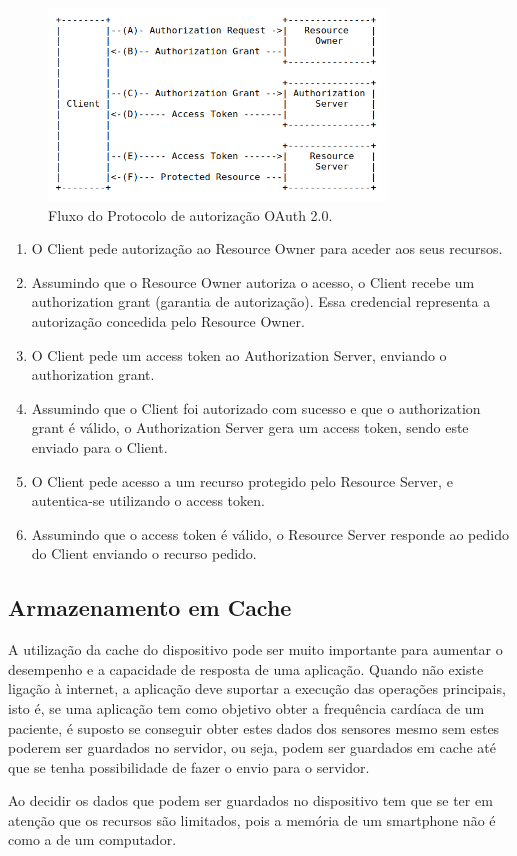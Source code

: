 \documentclass[11pt,twoside,a4paper]{report}
\begin{document}
\begin{figure}[H]
  \centering
  \includegraphics[width=0.8\textwidth]{imgs/oauth2flow.png}
  \caption[Fluxo do Protocolo 2.0]{Fluxo do Protocolo de autorização OAuth 2.0. \cite{oauth20}}
  \label{f:oauth2flow}
\end{figure}

\begin{enumerate}[label=(\Alph*)]
    \item O Client pede autorização ao Resource Owner para aceder aos seus recursos.
    \item Assumindo que o Resource Owner autoriza o acesso, o Client recebe um authorization grant (garantia de autorização). Essa credencial representa a autorização concedida pelo Resource Owner.
    \item O Client pede um access token ao Authorization Server, enviando o authorization grant.
    \item Assumindo que o Client foi autorizado com sucesso e que o authorization grant é válido, o Authorization Server gera um access token, sendo este enviado para o Client.
    \item O Client pede acesso a um recurso protegido pelo Resource Server, e autentica-se utilizando o access token.
    \item Assumindo que o access token é válido, o Resource Server responde ao pedido do Client enviando o recurso pedido.
\end{enumerate}

\subsection{Armazenamento em Cache}

A utilização da cache do dispositivo pode ser muito importante para aumentar o desempenho e a capacidade de resposta de uma aplicação. Quando não existe ligação à internet, a aplicação deve suportar a execução das operações principais, isto é, se uma aplicação tem como objetivo obter a frequência cardíaca de um paciente, é suposto se conseguir obter estes dados dos sensores mesmo sem estes poderem ser guardados no servidor, ou seja, podem ser guardados em cache até que se tenha possibilidade de fazer o envio para o servidor.
\par
Ao decidir os dados que podem ser guardados no dispositivo tem que se ter em atenção que os recursos são limitados, pois a memória de um smartphone não é como a de um computador.
\end{document}
